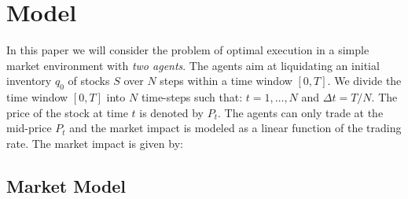 \documentclass[11pt,a4paper]{article}
\begin{document}
\section{Model}
In this paper we will consider the problem of optimal execution in a simple market environment with \emph{two agents}. The agents aim at liquidating an initial inventory $q_0$ of stocks $S$ over $N$ steps within a time window $[0, T]$.
We divide the time window $[0,T]$ into $N$ time-steps such that: $t = 1, \dots, N$ and $\Delta t = T/N$. The price of the stock at time $t$ is denoted by $P_t$. The agents can only trade at the mid-price $P_t$ and the market impact is modeled as a linear function of the trading rate. The market impact is given by:

\subsection{Market Model}
\end{document}

